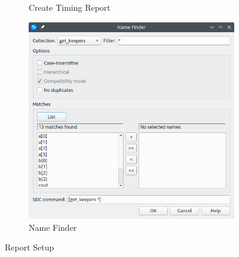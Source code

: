 \documentclass[12pt]{labmanual}
\begin{document}
\begin{minipage}[htbp!]{\linewidth}
\begin{minipage}[ht!]{0.5\linewidth}
\begin{figure}[H]
\begin{subfigure}{\linewidth}
        \caption{Create Timing Report}
        \label{fig:timingreportconfig}
    \end{subfigure}
    \vspace{2mm}
    \begin{subfigure}{\linewidth}
        \includegraphics[width=\linewidth]{nameselection.png}
        \caption{Name Finder}
        \label{fig:namefinder}
    \end{subfigure}
    \caption{Report Setup}
    \end{figure}
    \end{minipage}
\end{minipage}%
\hspace{-0.46\textwidth}
\end{document}
